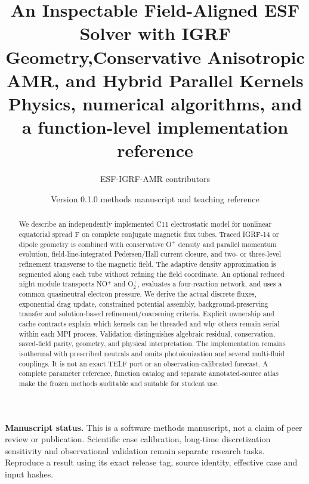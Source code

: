 \documentclass[11pt,a4paper]{article}
\title{An Inspectable Field-Aligned ESF Solver with IGRF Geometry,\newline Conservative Anisotropic AMR, and Hybrid Parallel Kernels\\[4pt]\large Physics, numerical algorithms, and a function-level implementation reference}
\author{ESF-IGRF-AMR contributors}
\date{Version 0.1.0 methods manuscript and teaching reference}
\begin{document}
\maketitle
\begin{abstract}
We describe an independently implemented C11 electrostatic model for nonlinear
equatorial spread F on complete conjugate magnetic flux tubes. Traced IGRF-14
or dipole geometry is combined with conservative O$^+$ density and parallel
momentum evolution, field-line-integrated Pedersen/Hall current closure, and
two- or three-level refinement transverse to the magnetic field. The adaptive
density approximation is segmented along each tube without refining the
field coordinate. An optional reduced night module transports NO$^+$ and
O$_2^+$, evaluates a four-reaction network, and uses a common quasineutral
electron pressure. We derive the actual discrete fluxes, exponential drag
update, constrained potential assembly, background-preserving transfer and
solution-based refinement/coarsening criteria. Explicit ownership and cache
contracts explain which kernels can be threaded and why others remain
serial within each MPI process. Validation distinguishes algebraic residual,
conservation, saved-field parity, geometry, and physical interpretation.
The implementation remains isothermal with prescribed neutrals and omits
photoionization and several multi-fluid couplings. It is not an exact TELF
port or an observation-calibrated forecast. A complete parameter reference,
function catalog and separate annotated-source atlas make the frozen methods
auditable and suitable for student use.
\end{abstract}
\noindent\textbf{Manuscript status.} This is a software methods manuscript,
not a claim of peer review or publication. Scientific case calibration,
long-time discretization sensitivity and observational validation remain
separate research tasks. Reproduce a result using its exact release tag,
source identity, effective case and input hashes.
\tableofcontents
\clearpage







\appendix


\end{document}

